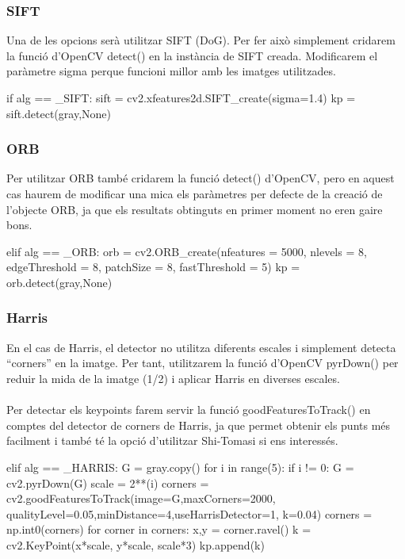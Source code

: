 		\subsubsection{SIFT}
		Una de les opcions serà utilitzar SIFT (DoG). Per fer això simplement cridarem la funció d'OpenCV detect() en la instància de SIFT creada. Modificarem el paràmetre sigma perque funcioni millor
		amb les imatges utilitzades.\\
		\begin{python}
	if alg == _SIFT:
		sift = cv2.xfeatures2d.SIFT_create(sigma=1.4)
		kp = sift.detect(gray,None)
		\end{python}

		\subsubsection{ORB}
		Per utilitzar ORB també cridarem la funció detect() d'OpenCV, pero en aquest cas haurem de modificar una mica els paràmetres per defecte de la creació de l'objecte ORB, ja que els resultats obtinguts
		en primer moment no eren gaire bons.\\
		\begin{python}
	elif alg == _ORB:
		orb = cv2.ORB_create(nfeatures = 5000, nlevels = 8, edgeThreshold = 8,
		 patchSize = 8, fastThreshold = 5)
		kp = orb.detect(gray,None)
		\end{python}
\newpage
		\subsubsection{Harris}
		En el cas de Harris, el detector no utilitza diferents escales i simplement detecta ``corners'' en la imatge. Per tant, utilitzarem la funció d'OpenCV pyrDown() per reduir
		la mida de la imatge (1/2) i aplicar Harris en diverses escales.\\\\
		Per detectar els keypoints farem servir la funció goodFeaturesToTrack() en comptes del detector de corners de Harris, ja que permet obtenir els punts més facilment i
		també té la opció d'utilitzar Shi-Tomasi si ens interessés.\\
		\begin{python}
	elif alg == _HARRIS:
		G = gray.copy()
		for i in range(5):
			if i != 0:
				G = cv2.pyrDown(G)
			scale = 2**(i)
			corners = cv2.goodFeaturesToTrack(image=G,maxCorners=2000,
				qualityLevel=0.05,minDistance=4,useHarrisDetector=1, k=0.04)
			corners = np.int0(corners)
			for corner in corners:
				x,y = corner.ravel()
				k = cv2.KeyPoint(x*scale, y*scale, scale*3)
				kp.append(k)
		\end{python}

